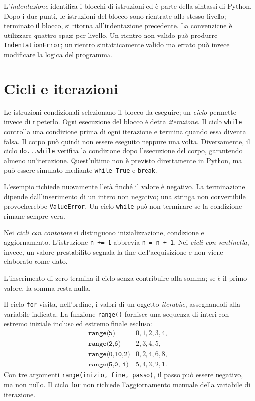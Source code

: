 

L'\emph{indentazione} identifica i blocchi di istruzioni ed è parte
della sintassi di Python. Dopo i due punti, le istruzioni del blocco
sono rientrate allo stesso livello; terminato il blocco, si ritorna
all'indentazione precedente. La convenzione è utilizzare quattro spazi
per livello. Un rientro non valido può produrre \texttt{IndentationError};
un rientro sintatticamente valido ma errato può invece modificare la
logica del programma.

\section{Cicli e iterazioni}
\label{sec:fi-python-cicli}

Le istruzioni condizionali selezionano il blocco da eseguire; un
\emph{ciclo} permette invece di ripeterlo. Ogni esecuzione del blocco
è detta \emph{iterazione}. Il ciclo \texttt{while} controlla una condizione
prima di ogni iterazione e termina quando essa diventa falsa. Il corpo
può quindi non essere eseguito neppure una volta. Diversamente, il ciclo
\texttt{do...while} verifica la condizione dopo l'esecuzione del corpo,
garantendo almeno un'iterazione. Quest'ultimo non è previsto direttamente in Python,
ma può essere simulato mediante \texttt{while True} e \texttt{break}.

\clearpage



L'esempio richiede nuovamente l'età finché il valore è negativo. La
terminazione dipende dall'inserimento di un intero non negativo; una
stringa non convertibile provocherebbe \texttt{ValueError}. Un ciclo
\texttt{while} può non terminare se la condizione rimane sempre vera.

Nei \emph{cicli con contatore} si distinguono inizializzazione,
condizione e aggiornamento. L'istruzione \texttt{n += 1} abbrevia
\texttt{n = n + 1}. Nei \emph{cicli con sentinella}, invece, un valore
prestabilito segnala la fine dell'acquisizione e non viene elaborato come
dato.



L'inserimento di zero termina il ciclo senza contribuire alla somma;
se è il primo valore, la somma resta nulla.

Il ciclo \texttt{for} visita, nell'ordine, i valori di un oggetto
\emph{iterabile}, assegnandoli alla variabile indicata. La funzione
\texttt{range()} fornisce una sequenza di interi con estremo iniziale
incluso ed estremo finale escluso:
\[
\begin{array}{ll}
  \texttt{range(5)} & 0,1,2,3,4,\\
  \texttt{range(2,6)} & 2,3,4,5,\\
  \texttt{range(0,10,2)} & 0,2,4,6,8,\\
  \texttt{range(5,0,-1)} & 5,4,3,2,1.
\end{array}
\]
Con tre argomenti \texttt{range(inizio, fine, passo)}, il passo può
essere negativo, ma non nullo. Il ciclo \texttt{for} non richiede
l'aggiornamento manuale della variabile di iterazione.

